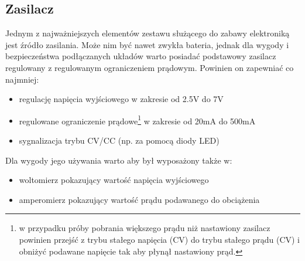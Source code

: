 % 
% 
% 
% 

\subsection{Zasilacz}

Jednym z najważniejszych elementów zestawu służącego do zabawy elektroniką jest źródło zasilania.
Może nim być nawet zwykła bateria, jednak dla wygody i bezpieczeństwa podłączanych układów warto posiadać podstawowy zasilacz regulowany z regulowanym ograniczeniem prądowym.
Powinien on zapewniać co najmniej:
\begin{itemize}
	\item regulację napięcia wyjściowego w zakresie od 2.5V do 7V
	\item regulowane ograniczenie prądowe\footnote{
		w przypadku próby pobrania większego prądu niż nastawiony zasilacz powinien
		przejść z trybu stałego napięcia (CV) do trybu stałego prądu (CV)
		i obniżyć podawane napięcie tak aby płynął nastawiony prąd.
	} w zakresie od 20mA do 500mA
	\item sygnalizacja trybu CV/CC (np. za pomocą diody LED)
\end{itemize}
Dla wygody jego używania warto aby był wyposażony także w:
\begin{itemize}
	\item woltomierz pokazujący wartość napięcia wyjściowego
	\item amperomierz pokazujący wartość prądu podawanego do obciążenia
\end{itemize}

